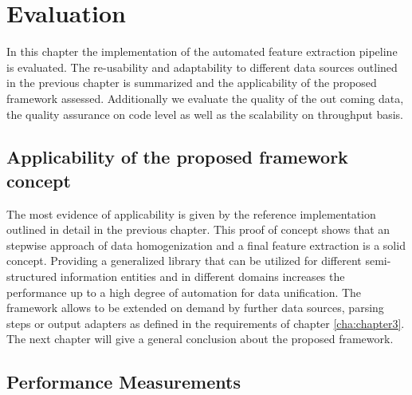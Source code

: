 \chapter{Evaluation\label{cha:chapter6}}

In this chapter the implementation of the automated feature extraction pipeline is evaluated. The re-usability and adaptability to different data sources outlined in the previous chapter is summarized and the applicability of the proposed framework assessed. Additionally we evaluate the quality of the out coming data, the quality assurance on code level as well as the scalability on throughput basis. 

\section{Applicability of the proposed framework concept}

The most evidence of applicability is given by the reference implementation outlined in detail in the previous chapter. This proof of concept shows that an stepwise approach of data homogenization and a final feature extraction is a solid concept. Providing a generalized library that can be utilized for different semi-structured information entities and in different domains increases the performance up to a high degree of automation for data unification. The framework allows to be extended on demand by further data sources, parsing steps or output adapters as defined in the requirements of chapter \ref{cha:chapter3}. The next chapter will give a general conclusion about the proposed framework.

\section{Performance Measurements\label{sec:performance}}

